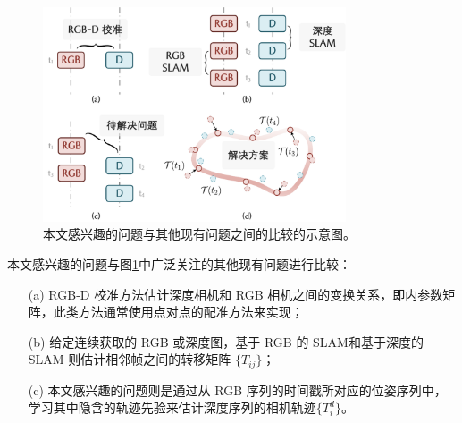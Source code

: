 \begin{figure}[ht]
    \centering
    \includegraphics[width=0.8\textwidth]{undergraduate-thesis/images/time-pose function/teaser.pdf}
    \caption{本文感兴趣的问题与其他现有问题之间的比较的示意图。}
    \label{fig: time-pose function teaser}
\end{figure}

本文感兴趣的问题与图\ref{fig: time-pose function teaser}中广泛关注的其他现有问题进行比较：
\begin{enumerate}
    \item [(a)]RGB-D 校准方法\cite{jeong_self-calibrating_2021, bian_nope-nerf_2022}估计深度相机和 RGB 相机之间的变换关系，即内参数矩阵，此类方法通常使用点对点的配准方法来实现；
    \item [(b)] 给定连续获取的 RGB 或深度图，基于 RGB 的 SLAM\cite{campos_orb-slam3_2021, mur-artal_orb-slam_2015, engel_direct_2018, zhu_nicer-slam_2023}和基于深度的 SLAM \cite{niesner_real-time_2013, xu_multi-scale_2018}则估计相邻帧之间的转移矩阵 $\{T_{ij}\}$；
    \item [(c)] 本文感兴趣的问题则是通过从 RGB 序列的时间戳所对应的位姿序列中，学习其中隐含的轨迹先验来估计深度序列的相机轨迹$\{T_i^d\}$。
\end{enumerate}

